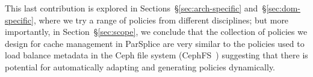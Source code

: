 
This last contribution is explored in Sections~\S\ref{sec:arch-specific}
and~\S\ref{sec:dom-specific}, where we try a range of policies from different
disciplines; but more importantly, in Section~\S\ref{sec:scope}, we conclude
that the collection of policies we design for cache management in ParSplice are
very similar to the policies used to load balance metadata in the Ceph file
system (CephFS~\cite{weil:osdi2006-ceph}) suggesting that there is potential
for automatically adapting and generating policies dynamically.  


